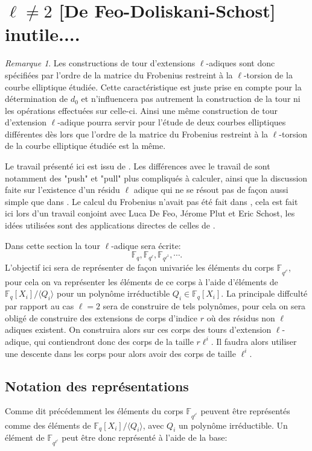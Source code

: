 \documentclass[10pt,a4paper]{book}
\theoremstyle{plain}
\theoremstyle{definition}
\theoremstyle{definition}
\theoremstyle{definition}
\theoremstyle{definition}
\theoremstyle{remark}
\newtheorem{rem}[thm]{Remarque}
\theoremstyle{remark}
\theoremstyle{definition}
\begin{document}
\section{$\ell \neq 2$ [De Feo-Doliskani-Schost] inutile....}

\begin{rem}
Les constructions de tour d'extensions $\ell$-adiques sont donc spécifiées par l'ordre de la matrice du Frobenius restreint à la $\ell$-torsion de la courbe elliptique étudiée. Cette caractéristique est juste prise en compte pour la détermination de $d_0$ et n'influencera pas autrement la construction de la tour ni les opérations effectuées sur celle-ci. Ainsi une même construction de tour d'extension $\ell$-adique pourra servir pour l'étude de deux courbes elliptiques différentes dès lors que l'ordre de la matrice du Frobenius restreint à la $\ell$-torsion de la courbe elliptique étudiée est la même.
\end{rem}

Le travail présenté ici est issu de \cite{DeFeo-Doliskani-Schost13}. Les différences avec le travail de \cite{Doliskani-Schost15} sont notamment des "push" et "pull" plus compliqués à calculer, ainsi que la discussion faite sur l'existence d'un résidu $\ell$ adique qui ne se résout pas de façon aussi simple que dans \cite{Doliskani-Schost15}. Le calcul du Frobenius n'avait pas été fait dans \cite{DeFeo-Doliskani-Schost13}, cela est fait ici lors d'un travail conjoint avec Luca De Feo, Jérome Plut et Eric Schost, les idées utilisées sont des applications directes de celles de \cite{Doliskani-Schost15}.

Dans cette section la tour $\ell$-adique sera écrite:
\[
\mathbb{F}_q, \mathbb{F}_{q^\ell}, \mathbb{F}_{q^{\ell^2}}, \cdots.
\]
L'objectif ici sera de représenter de façon univariée les éléments du corps $\mathbb{F}_{q^{\ell^i}}$, pour cela on va représenter les éléments de ce corps à l'aide d'éléments de $\mathbb{F}_{q}[X_i]/\langle Q_i \rangle$ pour un polynôme irréductible $Q_i \in \mathbb{F}_q[X_i]$. La principale diffculté par rapport au cas $\ell=2$ sera de construire de tels polynômes, pour cela on sera obligé de construire des extensions de corps d'indice $r$ où des résidus non $\ell$ adiques existent. On construira alors sur ces corps des tours d'extension $\ell$-adique, qui contiendront donc des corps de la taille $r\ell^i$. Il faudra alors utiliser une descente dans les corps pour alors avoir des corps de taille $\ell^i$.

\subsection{Notation des représentations}
Comme dit précédemment les éléments du corps $\mathbb{F}_{q^{\ell^i}}$ peuvent être représentés comme des éléments de $\mathbb{F}_q[X_i]/\langle Q_i \rangle $, avec $Q_i$ un polynôme irréductible. Un élément de $\mathbb{F}_{q^{\ell^i}}$ peut être donc représenté à l'aide de la base:
\end{document}
